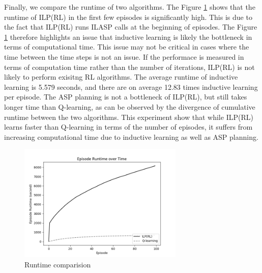 Finally, we compare the runtime of two algorithms. 
The Figure \ref{exp1_runtime} shows that the runtime of ILP(RL) in the first few episodes is significantly high. 
This is due to the fact that ILP(RL) runs ILASP calls at the beginning of episodes.
The Figure \ref{exp1_runtime} therefore highlights an issue that inductive learning is likely the bottleneck in terms of computational time.
This issue may not be critical in cases where the time between the time steps is not an issue. If the performace is measured in terms of computation time rather than the number of iterations, 
ILP(RL) is not likely to perform exisitng RL algorithms. 
The average runtime of inductive learning is 5.579 seconds, and there are on average 12.83 times inductive learning per episode. 
The ASP planning is not a bottleneck of ILP(RL), but still takes longer time than Q-learning, as can be observed by the divergence of cumulative runtime between the two algorithms. 
This experiment show that while ILP(RL) learns faster than Q-learning in terms of the number of episodes, it suffers from increasing computational time due to inductive learning as well as ASP planning.

\begin{figure}[!htb]
\centering
\includegraphics[width=0.7\textwidth]{./figures/experiment1_runtime}
\caption{Runtime comparision}
\label{exp1_runtime}
\end{figure}


